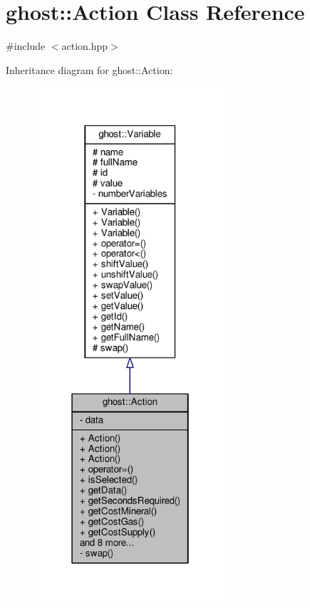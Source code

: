 \hypertarget{classghost_1_1Action}{\section{ghost\-:\-:Action Class Reference}
\label{classghost_1_1Action}
}


{\ttfamily \#include $<$action.\-hpp$>$}



Inheritance diagram for ghost\-:\-:Action\-:
\nopagebreak
\begin{figure}[H]
\begin{center}
\leavevmode
\includegraphics[width=202pt]{classghost_1_1Action__inherit__graph}
\end{center}
\end{figure}


